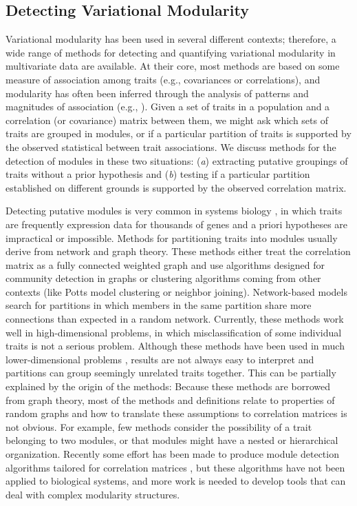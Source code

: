 \begin{refsection}
\subsection{Detecting Variational Modularity}

Variational modularity has been used in several different contexts;
therefore, a wide range of methods for detecting and quantifying
variational modularity in multivariate data are available. At their
core, most methods are based on some measure of association among traits
(e.g., covariances or correlations), and modularity has often been
inferred through the analysis of patterns and magnitudes of association
(e.g., \textcite{Armbruster2004-ic, Porto2009-pi}). Given a set of
traits in a population and a correlation (or covariance) matrix between
them, we might ask which sets of traits are grouped in modules, or if a
particular partition of traits is supported by the observed statistical
between trait associations. We discuss methods for the detection of
modules in these two situations: (\emph{a}) extracting putative
groupings of traits without a prior hypothesis and (\emph{b}) testing if
a particular partition established on different grounds is supported by
the observed correlation matrix.

Detecting putative modules is very common in systems biology 
\parencite{Ayroles2009-ld, Ihmels2002-fg}, in which traits
are frequently expression data for thousands of genes and a priori
hypotheses are impractical or impossible. Methods for partitioning
traits into modules usually derive from network and graph theory. These
methods either treat the correlation matrix as a fully connected
weighted graph and use algorithms designed for community detection in
graphs \parencite{Langfelder2008-qa, Reichardt2006-xi} or
clustering algorithms coming from other contexts (like Potts model
clustering or neighbor joining). Network-based models search for
partitions in which members in the same partition share more connections
than expected in a random network. Currently, these methods work well in
high-dimensional problems, in which misclassification of some individual
traits is not a serious problem. Although these methods have been used
in much lower-dimensional problems
\parencite{Magwene2001-an}, results are not always
easy to interpret and partitions can group seemingly unrelated traits
together. This can be partially explained by the origin of the methods:
Because these methods are borrowed from graph theory, most of the
methods and definitions relate to properties of random graphs and how to
translate these assumptions to correlation matrices is not obvious. For
example, few methods consider the possibility of a trait belonging to
two modules, or that modules might have a nested or hierarchical
organization. Recently some effort has been made to produce module
detection algorithms tailored for correlation matrices \parencite{MacMahon2015-aj}, 
but these algorithms have not been applied to biological systems, and more
work is needed to develop tools that can deal with complex modularity
structures.


\end{refsection}
